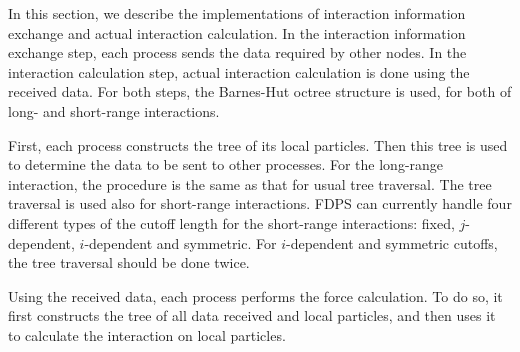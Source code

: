 In this section, we describe the implementations of interaction
information exchange and actual interaction calculation.
In the interaction information exchange step,
each process sends the  data required by other nodes. In the
interaction calculation step, actual interaction calculation is done
using the received data.
For both steps, the Barnes-Hut octree structure is used, for both of
long- and short-range interactions.

First, each process constructs the tree of its local particles. Then
this tree is used to determine the data to be sent to other
processes. For the long-range interaction, the procedure is the same
as that for usual tree traversal\citep{1986Natur.324..446B,
1990JCoPh..87..161B}.  The tree traversal is used also for short-range
interactions.  FDPS can currently handle four different types of the
cutoff length for the short-range interactions: fixed, $j$-dependent,
$i$-dependent and symmetric.  For $i$-dependent and symmetric cutoffs,
the tree traversal should be done twice.


Using the received data, each process performs the force
calculation. To do so, it first constructs the tree of all data
received and local particles, and then uses it to calculate  the
interaction on local particles.


